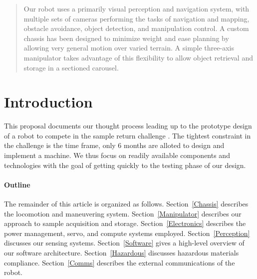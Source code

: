 \documentclass[12pt]{article}
\begin{document}
\maketitle

\begin{abstract}
Our robot uses a primarily visual perception and navigation system, with multiple sets of cameras performing the tasks of navigation and mapping, obstacle avoidance, object detection, and manipulation control. A custom chassis has been designed to minimize weight and ease planning by allowing very general motion over varied terrain. A simple three-axis manipulator takes advantage of this flexibility to allow object retrieval and storage in a sectioned carousel.

\end{abstract}

\section{Introduction}
This proposal documents our thought process leading up to the prototype design of a robot to compete in the sample return challenge \cite{rules}. The tightest constraint in the challenge is the time frame, only 6 months are alloted to design and implement a machine. We thus focus on readily available components and technologies with the goal of getting quickly to the testing phase of our design.

\paragraph{Outline}
The remainder of this article is organized as follows.
Section~\ref{Chassis} describes the locomotion and maneuvering system. Section~\ref{Manipulator} describes our approach to sample acquisition and storage. Section~\ref{Electronics} describes the power management, servo, and compute systems employed. Section~\ref{Perception} discusses our sensing systems. Section~\ref{Software} gives a high-level overview of our software architecture. Section~\ref{Hazardous} discusses hazardous materials compliance. Section~\ref{Comms} describes the external communications of the robot.


%
%
\end{document}
